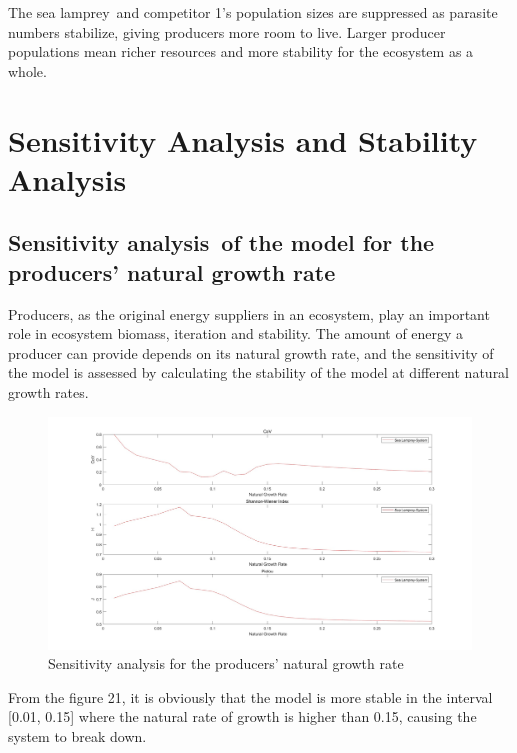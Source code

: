 \documentclass[12pt]{article}  %
\begin{document}
The sea lamprey and competitor 1's population sizes are suppressed as parasite numbers stabilize, giving producers more room to live. Larger producer populations mean richer resources and more stability for the ecosystem as a whole.\par
\section{Sensitivity Analysis and Stability Analysis}
\subsection{Sensitivity analysis of the model for the producers' natural growth rate}
\par
Producers, as the original energy suppliers in an ecosystem, play an important role in ecosystem biomass, iteration and stability. The amount of energy a producer can provide depends on its natural growth rate, and the sensitivity of the model is assessed by calculating the stability of the model at different natural growth rates.
\par
\begin{figure}[htbp]  %
	\centering  %
	\includegraphics[width=.9\textwidth]{img/ngr.jpg} %
	\caption{Sensitivity analysis  for the producers' natural growth rate} %
\end{figure}
\par
From the figure 21, it is obviously that the model is more stable in the interval [0.01, 0.15] where the natural rate of growth is higher than 0.15, causing the system to break down.\par
\end{document}
